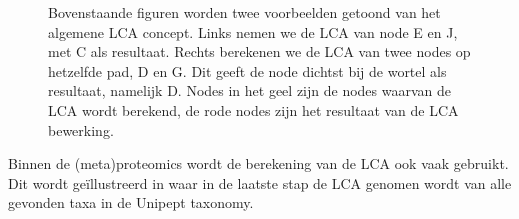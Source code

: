\begin{figure}
    \centering
    
    \begin{subfigure}{0.45\linewidth}
        \centering
        \caption{}
        \label{tikz:lcaej}
    \end{subfigure}
    \begin{subfigure}{0.45\linewidth}
        \centering
        \caption{}
        \label{tikz:lcadg}
    \end{subfigure}
                
    \caption{Bovenstaande figuren worden twee voorbeelden getoond van het
    algemene LCA concept. Links nemen we de LCA van node E en J, met C als
    resultaat. Rechts berekenen we de LCA van twee nodes op hetzelfde pad, D en
    G. Dit geeft de node dichtst bij de wortel als resultaat, namelijk D. Nodes
    in het geel zijn de nodes waarvan de LCA wordt berekend, de rode nodes zijn
    het resultaat van de LCA bewerking.} 
    \label{tikz:lcavoorbeeld}
\end{figure}

Binnen de (meta)proteomics wordt de berekening van de LCA ook vaak gebruikt. Dit
wordt geïllustreerd in  waar in de laatste stap de LCA
genomen wordt van alle gevonden taxa in de Unipept taxonomy.

